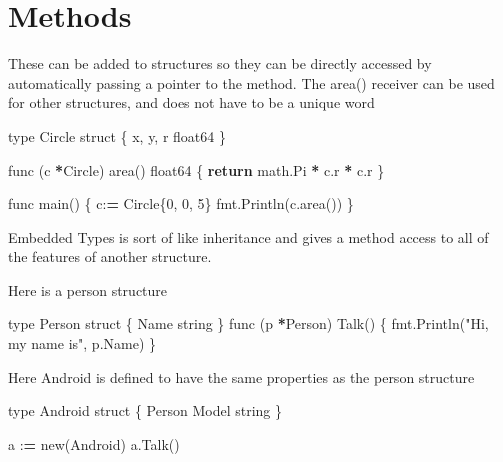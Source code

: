 \documentclass[]{book}
\newenvironment{Shaded}{\begin{snugshade}}{\end{snugshade}}
\newcommand{\DecValTok}[1]{\textcolor[rgb]{0.00,0.00,0.81}{#1}}
\newcommand{\StringTok}[1]{\textcolor[rgb]{0.31,0.60,0.02}{#1}}
\newcommand{\ControlFlowTok}[1]{\textcolor[rgb]{0.13,0.29,0.53}{\textbf{#1}}}
\newcommand{\OperatorTok}[1]{\textcolor[rgb]{0.81,0.36,0.00}{\textbf{#1}}}
\newcommand{\BuiltInTok}[1]{#1}
\newcommand{\NormalTok}[1]{#1}
\begin{document}
\section{Methods}\label{methods}

These can be added to structures so they can be directly accessed by
automatically passing a pointer to the method. The area() receiver can
be used for other structures, and does not have to be a unique word

\begin{Shaded}
\begin{Highlighting}[]
\BuiltInTok{type}\NormalTok{ Circle struct \{             }
\NormalTok{    x, y, r float64              }
\NormalTok{\}                                }
                                 
\NormalTok{func (c }\OperatorTok{*}\NormalTok{Circle) area() float64 \{}
    \ControlFlowTok{return}\NormalTok{ math.Pi }\OperatorTok{*}\NormalTok{ c.r }\OperatorTok{*}\NormalTok{ c.r   }
\NormalTok{\}                                }
                                 
\NormalTok{func main() \{                    }
\NormalTok{    c:}\OperatorTok{=}\NormalTok{ Circle\{}\DecValTok{0}\NormalTok{, }\DecValTok{0}\NormalTok{, }\DecValTok{5}\NormalTok{\}          }
\NormalTok{    fmt.Println(c.area())        }
\NormalTok{\}   }
\end{Highlighting}
\end{Shaded}

Embedded Types is sort of like inheritance and gives a method access to
all of the features of another structure.

Here is a person structure

\begin{Shaded}
\begin{Highlighting}[]
\BuiltInTok{type}\NormalTok{ Person struct \{}
\NormalTok{  Name string}
\NormalTok{\}}
\NormalTok{func (p }\OperatorTok{*}\NormalTok{Person) Talk() \{}
\NormalTok{  fmt.Println(}\StringTok{"Hi, my name is"}\NormalTok{, p.Name)}
\NormalTok{\}}
\end{Highlighting}
\end{Shaded}

Here Android is defined to have the same properties as the person
structure

\begin{Shaded}
\begin{Highlighting}[]
\BuiltInTok{type}\NormalTok{ Android struct \{}
\NormalTok{  Person}
\NormalTok{  Model string}
\NormalTok{\}}

\NormalTok{a :}\OperatorTok{=}\NormalTok{ new(Android)}
\NormalTok{a.Talk()}
\end{Highlighting}
\end{Shaded}
\end{document}

